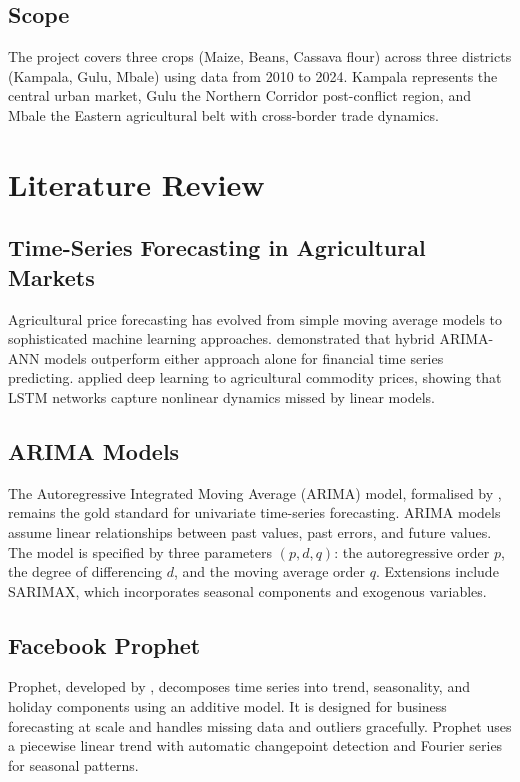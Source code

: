 \documentclass[12pt,a4paper]{article}
\begin{document}
\subsection{Scope}
The project covers three crops (Maize, Beans, Cassava flour) across three districts (Kampala, Gulu, Mbale) using data from 2010 to 2024. Kampala represents the central urban market, Gulu the Northern Corridor post-conflict region, and Mbale the Eastern agricultural belt with cross-border trade dynamics.

\section{Literature Review}

\subsection{Time-Series Forecasting in Agricultural Markets}
Agricultural price forecasting has evolved from simple moving average models to sophisticated machine learning approaches. \citet{zhang2003} demonstrated that hybrid ARIMA-ANN models outperform either approach alone for financial time series predicting. \citet{xiong2015} applied deep learning to agricultural commodity prices, showing that LSTM networks capture nonlinear dynamics missed by linear models.

\subsection{ARIMA Models}
The Autoregressive Integrated Moving Average (ARIMA) model, formalised by \citet{box2015}, remains the gold standard for univariate time-series forecasting. ARIMA models assume linear relationships between past values, past errors, and future values. The model is specified by three parameters $(p, d, q)$: the autoregressive order $p$, the degree of differencing $d$, and the moving average order $q$. Extensions include SARIMAX, which incorporates seasonal components and exogenous variables.

\subsection{Facebook Prophet}
Prophet, developed by \citet{taylor2018}, decomposes time series into trend, seasonality, and holiday components using an additive model. It is designed for business forecasting at scale and handles missing data and outliers gracefully. Prophet uses a piecewise linear trend with automatic changepoint detection and Fourier series for seasonal patterns.
\end{document}
